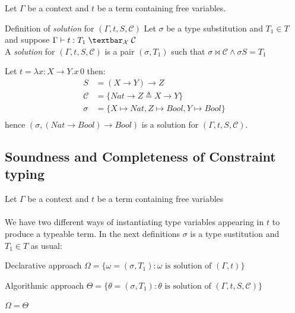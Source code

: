 \documentclass[8pt]{beamer}
\begin{document}
\begin{frame}
    Let $\Gamma$ be a context and $t$ be a term containing free variables.
    \begin{block}{Definition of \emph{solution} for $(\Gamma, t, S, \mathcal{C})$}
        Let $\sigma$ be a type substitution and $T_{1} \in T$ and suppose
            $\Gamma \vdash t : T_1 \; \textbar_\mathcal{X} \; \mathcal{C}$ \\
        A  \emph{solution} for $(\Gamma, t, S, \mathcal{C})$ is a pair 
        $(\sigma, T_{1})$ such that $\sigma \Join \mathcal{C} \wedge \sigma S = T_1$
    \end{block}
    \pause
    \begin{example}
        Let $t = \lambda x:X\rightarrow Y. x \, 0$ then:
        \begin{displaymath}
            \begin{split}
                S &= (X \rightarrow Y) \rightarrow Z \\
                \mathcal{C} &= \{Nat \rightarrow Z \triangleq X \rightarrow Y\}\\
                \sigma &= \{X \mapsto Nat, Z \mapsto Bool, Y \mapsto Bool\}\\
            \end{split}
        \end{displaymath}
        hence $(\sigma, (Nat \rightarrow Bool) \rightarrow Bool)$ is a solution 
        for $(\Gamma, t, S, \mathcal{C})$.
    \end{example}
\end{frame}
\subsection{Soundness and Completeness of Constraint typing}
\begin{frame}
    Let $\Gamma$ be a context and $t$ be a term containing free variables\\~\\
    We have two different ways of instantiating type variables appearing in $t$
    to produce a typeable term. In the next definitions $\sigma$ is a type
    sustitution and $T_1 \in T$ as usual:
    \begin{block}{Declarative approach}
        $\Omega = \{ \omega = (\sigma, T_1): \omega\text{ is solution of } (\Gamma, t)\}$
    \end{block}

    \begin{block}{Algorithmic approach}
        $\Theta = \{ \theta = (\sigma, T_1): \theta\text{ is solution of } 
            (\Gamma, t, S, \mathcal{C})\}$
    \end{block}
    
    \pause

    \begin{theorem}
    $\Omega = \Theta$    
    \end{theorem}
\end{frame}
\end{document}
